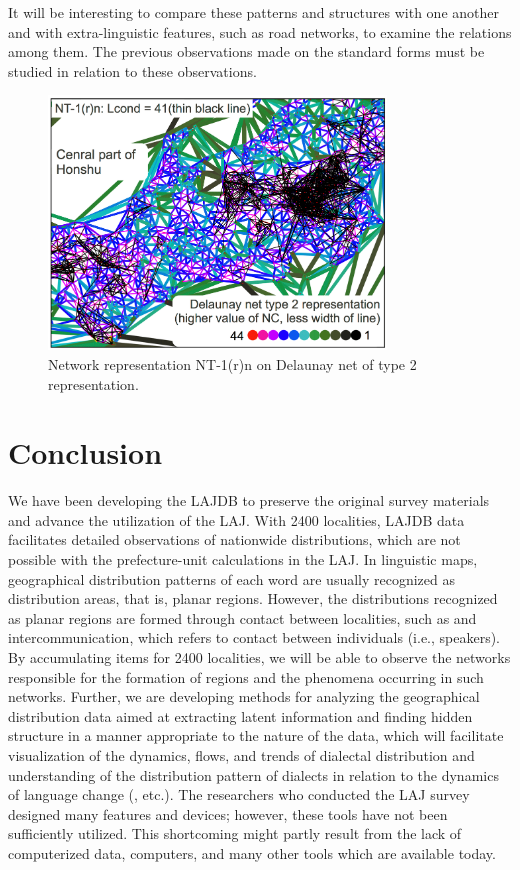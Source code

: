 \documentclass[output=paper]{LSP/langsci}
\begin{document}
It will be interesting to compare these patterns and structures with one another and with extra-linguistic features, such as road networks, to examine the relations among them. The previous observations made on the standard forms must be studied in relation to these observations.

\begin{figure}
\includegraphics[width=0.8\textwidth]{illustrations/kuma_fig25}
\caption{Network representation NT-1(r)n on Delaunay net of type 2 representation.}
\label{fig:25}
\end{figure}  


\section{Conclusion}
We have been developing the LAJDB to preserve the original survey materials and advance the utilization of the LAJ. With 2400 localities, LAJDB data facilitates detailed observations of nationwide distributions, which are not possible with the prefecture-unit calculations in the LAJ. In linguistic maps, geographical distribution patterns of each word are usually recognized as distribution areas, that is, planar regions. However, the distributions recognized as planar regions are formed through contact between localities, such as  and intercommunication, which refers to contact between individuals (i.e., speakers). By accumulating items for 2400 localities, we will be able to observe the networks responsible for the formation of regions and the phenomena occurring in such networks. Further, we are developing methods for analyzing the geographical distribution data aimed at extracting latent information and finding hidden structure in a manner appropriate to the nature of the data, which will facilitate visualization of the dynamics, flows, and trends of dialectal distribution and understanding of the distribution pattern of dialects in relation to the dynamics of language change (\citealt{sibata_s&k_1993,kumagai_nihon_2013,kumagai_development_2013}, etc.). The researchers who conducted the LAJ survey designed many features and devices; however, these tools have not been sufficiently utilized. This shortcoming might partly result from the lack of computerized data, computers, and many other tools which are available today. 
\end{document}
